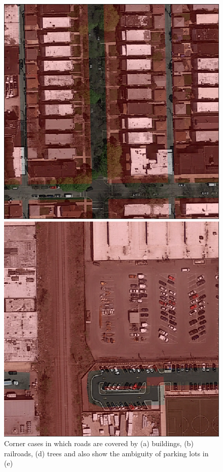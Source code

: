 \documentclass[10pt,conference,compsocconf]{IEEEtran}
\begin{document}
\begin{figure}
\begin{minipage}{0.2\textwidth}
	\end{minipage}
	\begin{minipage}{0.2\textwidth}
		\centering
		\includegraphics[width=1\textwidth]{img/trees.png} 
	\end{minipage}
	\begin{minipage}{0.2\textwidth}
		\centering
		\includegraphics[width=1\textwidth]{img/parkinglot.png}
	\end{minipage}
	\caption{Corner cases in which roads are covered by (a) buildings, (b) railroads, (d) trees and also show the ambiguity of parking lots in (e)}
	\label{fig:corner-cases}
\end{figure}
\end{document}
